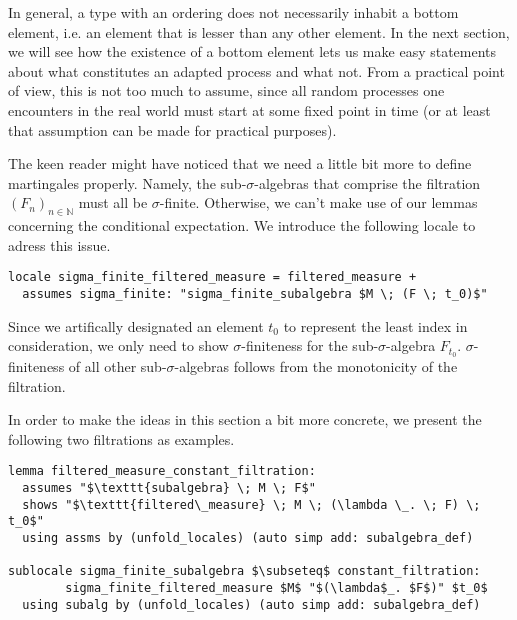 In general, a type with an ordering does not necessarily inhabit a bottom element, i.e. an element that is lesser than any other element. In the next section, we will see how the existence of a bottom element lets us make easy statements about what constitutes an adapted process and what not. From a practical point of view, this is not too much to assume, since all random processes one encounters in the real world must start at some fixed point in time (or at least that assumption can be made for practical purposes).

The keen reader might have noticed that we need a little bit more to define martingales properly. Namely, the sub-$\sigma$-algebras that comprise the filtration $(F_n)_{n \in \mathbb{N}}$ must all be $\sigma$-finite. Otherwise, we can't make use of our lemmas concerning the conditional expectation. We introduce the following locale to adress this issue.

\begin{isadefinition}
{\small
\begin{lstlisting}[style=isabelle]
locale sigma_finite_filtered_measure = filtered_measure +
  assumes sigma_finite: "sigma_finite_subalgebra $M \; (F \; t_0)$"
  \end{lstlisting}
}
\end{isadefinition}
\begin{remark}
	Since we artifically designated an element $t_0$ to represent the least index in consideration, we only need to show $\sigma$-finiteness for the sub-$\sigma$-algebra $F_{t_0}$. $\sigma$-finiteness of all other sub-$\sigma$-algebras follows from the monotonicity of the filtration.
\end{remark}

In order to make the ideas in this section a bit more concrete, we present the following two filtrations as examples.

\begin{isalemma}
{\small
\begin{lstlisting}[style=isabelle]
lemma filtered_measure_constant_filtration:
  assumes "$\texttt{subalgebra} \; M \; F$"
  shows "$\texttt{filtered\_measure} \; M \; (\lambda \_. \; F) \; t_0$"
  using assms by (unfold_locales) (auto simp add: subalgebra_def)

sublocale sigma_finite_subalgebra $\subseteq$ constant_filtration: 
		sigma_finite_filtered_measure $M$ "$(\lambda$_. $F$)" $t_0$
  using subalg by (unfold_locales) (auto simp add: subalgebra_def)
\end{lstlisting}
}
\end{isalemma}

